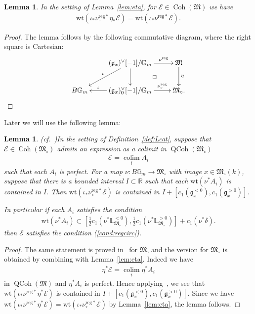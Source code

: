 \documentclass[11pt,oneside,a4paper,mathscr]{amsart}
\makeatletter
\newtheorem{lemma}[thm]{Lemma}
\theoremstyle{definition}
\newcommand{\QCoh}{\operatorname{QCoh}}
\newcommand{\cE}{\mathcal{E}}
\newcommand{\bgm}{B\mathbb{G}_m}
\newcommand{\diasquare}{\ar@{}[rd]|\square}
\newcommand{\Coh}{\operatorname{Coh}}
\newcommand{\wt}{\mathrm{wt}}
\makeatother
\begin{document}
\begin{lemma}\label{lem:eta2}
In the setting of Lemma~\ref{lem:eta}, for $\cE \in \Coh(\mathfrak{M})$ we have 
\begin{align*}
\wt(\iota_{*}\nu_{\circ}^{\mathrm{reg}*}\eta_{*}\cE)=\wt(\iota_{*}\nu^{\mathrm{reg}*}\cE).
\end{align*}
\end{lemma}
\begin{proof}
    The lemma follows by the following commutative diagram, where the right 
    square is Cartesian: 
    \begin{align*}
        \xymatrix{
& \ar[ld]_-{\iota} (\mathfrak{g}_x)^{\vee}[-1]/\mathbb{G}_m \ar[r]^-{\nu^{\mathrm{reg}}} \ar[d] \diasquare & \mathfrak{M} \ar[d]^-{\eta} \\
\bgm & \ar[l]_-{\iota} (\mathfrak{g}_x)_0^{\vee}[-1]/\mathbb{G}_m 
\ar[r]^-{\nu_{\circ}^{\mathrm{reg}}}  & \mathfrak{M}_{\circ}.
        }
    \end{align*}
\end{proof}

Later we will use the following lemma: 
\begin{lemma}\emph{(cf.~\cite[Lemma~6.2]{TodaGL2})}\label{lem:perfect2}
In the setting of Definition~\ref{def:Lcat}, suppose that
$\cE \in \Coh(\mathfrak{M}_{\circ})$ admits an expression as a colimit in
$\QCoh(\mathfrak{M}_{\circ})$
\begin{align*}
    \cE = \operatorname*{colim}_{i} A_i
\end{align*}
such that each $A_i$ is perfect. For a map $\nu \colon \bgm \to \mathfrak{M}_{\circ}$ with image $x\in \mathfrak{M}_{\circ}(k)$, 
suppose that there is a bounded interval $I \subset \mathbb{R}$ such that 
each $\wt(\nu^* A_i)$ is contained in $I$. Then 
$\wt(\iota_{*}\nu_\circ^{\mathrm{reg}*}\cE)$ is contained in $I+[c_1(\mathfrak{g}_x^{<0}), c_1(\mathfrak{g}_x^{>0})]$.

In particular if each $A_i$ satisfies the condition
\begin{align}\label{wt:cond2.5}
    \wt(\nu^* A_i) \subset \left[\frac{1}{2} c_1 (\nu^{\ast}\mathbb{L}_{\mathfrak{M}_{\circ}}^{<0}), 
    \frac{1}{2} c_1 (\nu^{\ast}\mathbb{L}_{\mathfrak{M}_{\circ}}^{>0})
    \right]+c_1(\nu^{\ast}\delta).
\end{align}
then $\cE$ satisfies the condition (\ref{cond:regcirc}). 
\end{lemma}
\begin{proof}
    The same statement is proved in~\cite[Lemma~6.2]{TodaGL2}
    for $\mathfrak{M}$, and the version for $\mathfrak{M}_{\circ}$
    is obtained by combining with Lemma~\ref{lem:eta}. 
    Indeed we have 
    \begin{align*}
   \eta^*\cE = \operatorname*{colim}_{i} \eta^*A_i
    \end{align*}
    in $\QCoh(\mathfrak{M})$ and $\eta^* A_i$ is perfect. Hence applying~\cite[Lemma~6.2]{TodaGL2}, 
    we see that $\wt(\iota_{*}\nu^{\mathrm{reg}*}\eta^* \cE)$
    is contained in $I+[c_1(\mathfrak{g}_x^{<0}), c_1(\mathfrak{g}_x^{>0})]$. 
    Since we have $\wt(\iota_{*}\nu^{\mathrm{reg}*}\eta^* \cE)=\wt(\iota_{*}\nu_\circ^{\mathrm{reg}*}\cE)$ by Lemma~\ref{lem:eta}, 
    the lemma follows. 
\end{proof}
\end{document}
